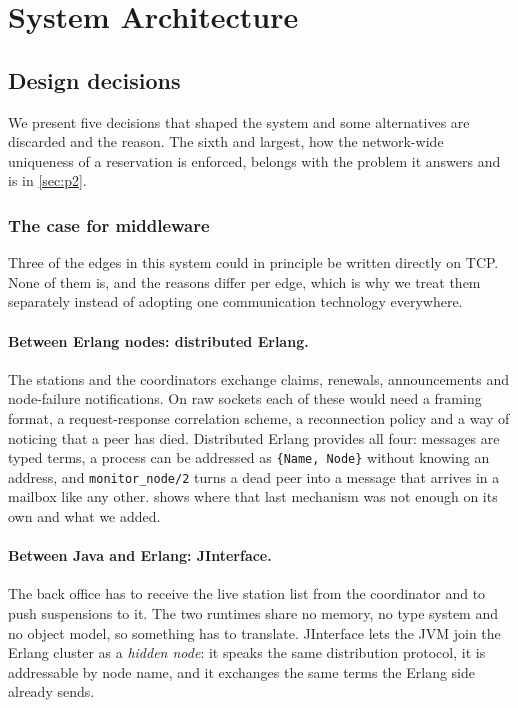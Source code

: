 \section{System Architecture}
\label{sec:architecture}

\subsection{Design decisions}
\label{sec:design-decisions}

We present five decisions that shaped the system and some alternatives are discarded
and the reason. The sixth and largest, how the network-wide uniqueness of a reservation is
enforced, belongs with the problem it answers and is in \cref{sec:p2}.

\subsubsection{The case for middleware}
\label{sec:why-middleware}

Three of the edges in this system could in principle be written directly on TCP. None of
them is, and the reasons differ per edge, which is why we treat them separately instead of
adopting one communication technology everywhere.

\paragraph{Between Erlang nodes: distributed Erlang.} The stations and the coordinators
exchange claims, renewals, announcements and node-failure notifications. On raw sockets each
of these would need a framing format, a request-response correlation scheme, a reconnection
policy and a way of noticing that a peer has died. Distributed Erlang provides all four:
messages are typed terms, a process can be addressed as \texttt{\{Name, Node\}} without
knowing an address, and \texttt{monitor\_node/2} turns a dead peer into a message that
arrives in a mailbox like any other.  shows where that last mechanism
was not enough on its own and what we added.

\paragraph{Between Java and Erlang: JInterface.} The back office has to receive the live
station list from the coordinator and to push suspensions to it. The two runtimes share no
memory, no type system and no object model, so something has to translate. JInterface lets
the JVM join the Erlang cluster as a \emph{hidden node}: it speaks the same distribution
protocol, it is addressable by node name, and it exchanges the same terms the Erlang side
already sends.

